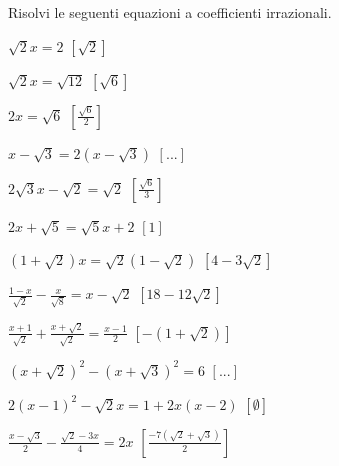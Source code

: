 \begin{esercizio}[\Ast]
 \label{ese:2.80}
Risolvi le seguenti equazioni a coefficienti irrazionali.
 \begin{multicols}{2}
 \begin{enumeratea}
 \item $\sqrt 2x=2$
  \hfill $\left[\sqrt 2 \right]$
 \item $\sqrt 2x=\sqrt{12}$
  \hfill $\left[\sqrt 6\right]$
 \item $2x=\sqrt 6$
  \hfill $\left[\frac{\sqrt{6}}{2}\right]$
 \item $x-\sqrt 3=2\left(x-\sqrt 3\right)$
  \hfill $\left[...\right]$
 \item $2\sqrt 3x-\sqrt 2=\sqrt 2$
  \hfill $\left[\frac{\sqrt 6} 3\right]$
 \item $2x+\sqrt 5=\sqrt 5x+2$
  \hfill $\left[1\right]$
 \item $(1+\sqrt 2)x=\sqrt 2(1-\sqrt 2)$
  \hfill $\left[4-3\sqrt 2\right]$
 \item $\frac{1-x}{\sqrt 2}-\frac x{\sqrt 8}=x-\sqrt 2$
  \hfill $\left[18-12\sqrt 2\right]$
 \item $\frac{x+1}{\sqrt 2}+\frac{x+\sqrt 2}{\sqrt 2}=\frac{x-1} 2$
  \hfill $\left[-(1+\sqrt 2)\right]$
 \item $(x+\sqrt 2)^2-(x+\sqrt 3)^2=6$
  \hfill $\left[...\right]$
 \item $2(x-1)^2-\sqrt 2x=1+2x(x-2)$
  \hfill $\left[\emptyset\right]$
 \item $\frac{x-\sqrt 3} 2-\frac{\sqrt 2-3x} 4=2x$
  \hfill $\left[\frac{-7(\sqrt 2+\sqrt 3)} 2\right]$
 \end{enumeratea}
 \end{multicols}
\end{esercizio}


